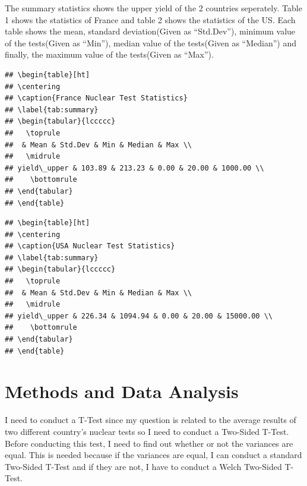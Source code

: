\documentclass[
  12pt,
]{article}
\begin{document}
The summary statistics shows the upper yield of the 2 countries seperately. Table 1 shows the statistics of France and table 2 shows the statistics of the US. Each table shows the mean, standard deviation(Given as ``Std.Dev''), minimum value of the tests(Given as ``Min''), median value of the tests(Given as ``Median'') and finally, the maximum value of the tests(Given as ``Max'').

\begin{verbatim}
## \begin{table}[ht]
## \centering
## \caption{France Nuclear Test Statistics} 
## \label{tab:summary}
## \begin{tabular}{lccccc}
##   \toprule
##  & Mean & Std.Dev & Min & Median & Max \\ 
##   \midrule
## yield\_upper & 103.89 & 213.23 & 0.00 & 20.00 & 1000.00 \\ 
##    \bottomrule
## \end{tabular}
## \end{table}
\end{verbatim}

\begin{verbatim}
## \begin{table}[ht]
## \centering
## \caption{USA Nuclear Test Statistics} 
## \label{tab:summary}
## \begin{tabular}{lccccc}
##   \toprule
##  & Mean & Std.Dev & Min & Median & Max \\ 
##   \midrule
## yield\_upper & 226.34 & 1094.94 & 0.00 & 20.00 & 15000.00 \\ 
##    \bottomrule
## \end{tabular}
## \end{table}
\end{verbatim}

\hypertarget{methods-and-data-analysis}{%
\section{Methods and Data Analysis}\label{methods-and-data-analysis}}

I need to conduct a T-Test since my question is related to the average results of two different country's nuclear tests so I need to conduct a Two-Sided T-Test. Before conducting this test, I need to find out whether or not the variances are equal. This is needed because if the variances are equal, I can conduct a standard Two-Sided T-Test and if they are not, I have to conduct a Welch Two-Sided T-Test.
\end{document}
